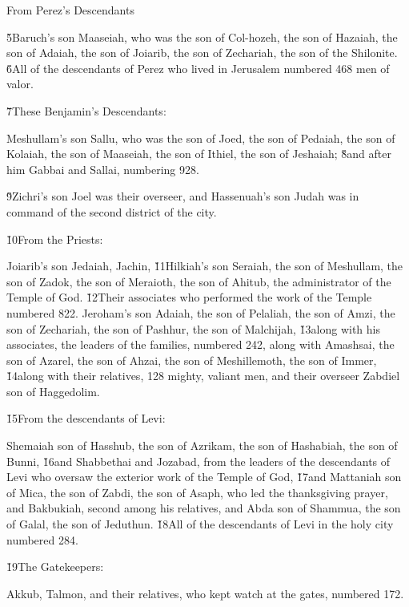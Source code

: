 From Perez's Descendants

\v{5}Baruch's son Maaseiah, who was the son of Col-hozeh, the son of Hazaiah, the son of Adaiah, the son of Joiarib, the son of Zechariah, the son of the Shilonite. \v{6}All of the descendants of Perez who lived in Jerusalem numbered 468 men of valor.

\v{7}These Benjamin's Descendants:

Meshullam's son Sallu, who was the son of Joed, the son of Pedaiah, the son of Kolaiah, the son of Maaseiah, the son of Ithiel, the son of Jeshaiah; \v{8}and after him Gabbai and Sallai, numbering 928.

\v{9}Zichri's son Joel was their overseer, and Hassenuah's son Judah was in command of the second district of the city.

\v{10}From the Priests:

Joiarib's son Jedaiah, Jachin, \v{11}Hilkiah's son Seraiah, the son of Meshullam, the son of Zadok, the son of Meraioth, the son of Ahitub, the administrator of the Temple of God. \v{12}Their associates who performed the work of the Temple numbered 822. Jeroham's son Adaiah, the son of Pelaliah, the son of Amzi, the son of Zechariah, the son of Pashhur, the son of Malchijah, \v{13}along with his associates, the leaders of the families, numbered 242, along with Amashsai, the son of Azarel, the son of Ahzai, the son of Meshillemoth, the son of Immer, \v{14}along with their relatives, 128 mighty, valiant men, and their overseer Zabdiel son of Haggedolim.

\v{15}From the descendants of Levi:

Shemaiah son of Hasshub, the son of Azrikam, the son of Hashabiah, the son of Bunni, \v{16}and Shabbethai and Jozabad, from the leaders of the descendants of Levi who oversaw the exterior work of the Temple of God, \v{17}and Mattaniah son of Mica, the son of Zabdi, the son of Asaph, who led the thanksgiving prayer, and Bakbukiah, second among his relatives, and Abda son of Shammua, the son of Galal, the son of Jeduthun. \v{18}All of the descendants of Levi in the holy city numbered 284.

\v{19}The Gatekeepers:

Akkub, Talmon, and their relatives, who kept watch at the gates, numbered 172.

